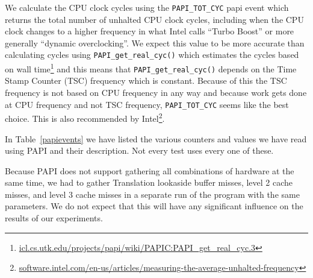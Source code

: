 We calculate the CPU clock cycles using the \texttt{PAPI\_TOT\_CYC} papi event which returns the total number of unhalted CPU clock cycles, including when the CPU clock changes to a higher frequency in what Intel calls “Turbo Boost” or more generally “dynamic overclocking”.
We expect this value to be more accurate than calculating cycles using \texttt{PAPI\_get\_real\_cyc()} which estimates the cycles based on wall time\footnote{\url{icl.cs.utk.edu/projects/papi/wiki/PAPIC:PAPI_get_real_cyc.3}} and this means that \texttt{PAPI\_get\_real\_cyc()} depends on the Time Stamp Counter (TSC) frequency which is constant. 
Because of this the TSC frequency is not based on CPU frequency in any way and because work gets done at CPU frequency and not TSC frequency, \texttt{PAPI\_TOT\_CYC} seems like the best choice. 
This is also recommended by Intel\footnote{\url{software.intel.com/en-us/articles/measuring-the-average-unhalted-frequency}}.

In Table~\ref{papievents} we have listed the various counters and values we have read using PAPI and their description. Not every test uses every one of these.

Because PAPI does not support gathering all combinations of hardware at the same time, we had to gather Translation lookaside buffer misses, level 2 cache misses, and level 3 cache misses in a separate run of the program with the same parameters.
We do not expect that this will have any significant influence on the results of our experiments.

